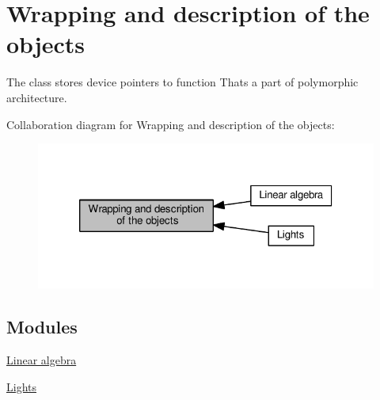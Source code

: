 \hypertarget{group__wrapping__and__description}{}\section{Wrapping and description of the objects}
\label{group__wrapping__and__description}


The class stores device pointers to function That\textquotesingle{}s a part of polymorphic architecture.  


Collaboration diagram for Wrapping and description of the objects\+:\nopagebreak
\begin{figure}[H]
\begin{center}
\leavevmode
\includegraphics[width=320pt]{group__wrapping__and__description}
\end{center}
\end{figure}
\subsection*{Modules}
\begin{DoxyCompactItemize}
\item 
\hyperlink{group__linear__algebra}{Linear algebra}
\item 
\hyperlink{group__lights}{Lights}
\end{DoxyCompactItemize}
